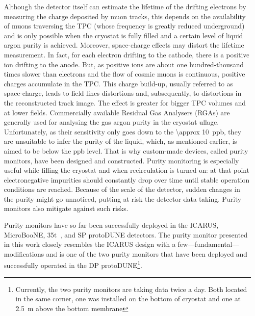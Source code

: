 \documentclass[a4paper,11pt]{article}
\begin{document}
Although the detector itself can estimate the lifetime of the drifting electrons by measuring the charge deposited by muon tracks, this depends on the availability of muons traversing the TPC (whose frequency is greatly reduced underground) and is only possible when the cryostat is fully filled and a certain level of liquid argon purity is achieved. Moreover, space-charge effects may distort the lifetime measurement. In fact, for each electron drifting to the cathode, there is a positive ion drifting to the anode. But, as positive ions are about one hundred-thousand times slower than electrons and the flow of cosmic muons is continuous, positive charges accumulate in the TPC. This charge build-up, usually referred to as space-charge, leads to field lines distortions and, subsequently, to distortions in the reconstructed track image. The effect is greater for bigger TPC volumes and at lower fields.
Commercially available Residual Gas Analysers (RGAs) are generally used for analysing the gas argon purity in the cryostat ullage. Unfortunately, as their sensitivity only goes down to the \SI{\approx 10}{ppb}, they are unsuitable to infer the purity of the liquid, which, as mentioned earlier, is aimed to be below the ppb level. 
That is why custom-made devices, called purity monitors, have been designed and constructed. 
Purity monitoring is especially useful while filling the cryostat and when recirculation is turned on: at that point electronegative impurities should constantly drop over time until stable operation conditions are reached. 
Because of the scale of the detector, sudden changes in the purity might go unnoticed, putting at risk the detector data taking. Purity monitors also mitigate against such risks. 

Purity monitors have so far been successfully deployed in the ICARUS, MicroBooNE, 35t~\cite{IDRvol2}, and SP protoDUNE detectors.
The purity monitor presented in this work closely resembles the ICARUS design with a few---fundamental---modifications and is one of the two purity monitors that have been deployed and successfully operated in the DP protoDUNE\footnote{Currently, the two purity monitors are taking data twice a day. Both located in the same corner, one was installed on the bottom of cryostat and one at \SI{2.5}{\metre} above the bottom membrane}.
\end{document}
